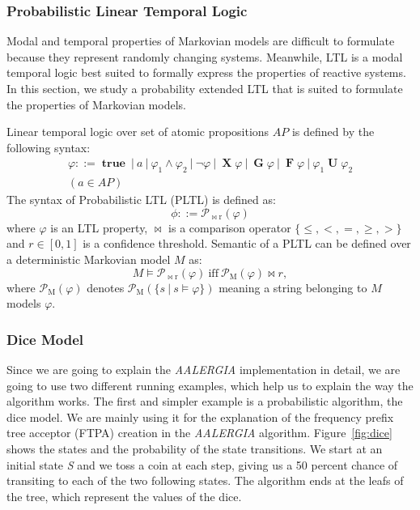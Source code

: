 \documentclass[
a4paper,
12pt
]{scrartcl}
\newcommand\true {\operatorname {\mathbf{true}}}
\newcommand\X{ \operatorname {\mathbf{X}}}
\newcommand\G{ \operatorname {\mathbf{G}}}
\newcommand\F{ \operatorname {\mathbf{F}}}
\newcommand\U{ \operatorname {\mathbf{U}}}
\newcommand\Prob[1]{ \operatorname {\mathcal{P}_{#1}}}
\begin{document}
\subsubsection{Probabilistic Linear Temporal Logic}
Modal and temporal properties of Markovian models are difficult to formulate because they represent randomly changing systems. Meanwhile, LTL is a modal temporal logic best suited to formally express the properties of reactive systems. In this section, we study a probability extended LTL that is suited to formulate the properties of Markovian models.
\par Linear temporal logic over set of atomic propositions $AP$ is defined by the following syntax:
\begin{multline*}
  \varphi ::= \true~|~a~|~\varphi_1 \land \varphi_2~|~\neg \varphi~|~\X \varphi~|~\G \varphi~|~\F \varphi~|~\varphi_1 \U \varphi_2 \\
  (a \in AP)
\end{multline*}
The syntax of Probabilistic LTL (PLTL) is defined as:
\begin{equation*}
  \phi ::= \Prob{\bowtie r} (\varphi)
\end{equation*}
where $\varphi$ is an LTL property, $\bowtie$ is a comparison operator $\{\leq, <, =, \geq, >\}$ and $r \in [0,1]$ is a confidence threshold.
Semantic of a PLTL can be defined over a deterministic Markovian model $M$ as:
\begin{equation*}
  M \models \Prob{\bowtie r}(\varphi)~\text{iff}~ \Prob{M}(\varphi) \bowtie r,
\end{equation*}
where $\Prob{M}(\varphi)$ denotes $\Prob{M}(\{s~|~s \models \varphi \})$ meaning a string belonging to $M$ models $\varphi$.
\subsubsection{Dice Model} \label{section:diceprograms}
Since we are going to explain the \emph{AALERGIA} implementation in detail, we are going to use two different running examples, which help us to explain the way the algorithm works. The first and simpler example is a probabilistic algorithm, the dice model\cite{KY76}. We are mainly using it for the explanation of the frequency prefix tree acceptor (FTPA) creation in the \emph{AALERGIA} algorithm. Figure~\ref{fig:dice} shows the states and the probability of the state transitions. We start at an initial state \textit{S} and we toss a coin at each step, giving us a 50 percent chance of transiting to each of the two following states. The algorithm ends at the leafs of the tree, which represent the values of the dice.
\end{document}
